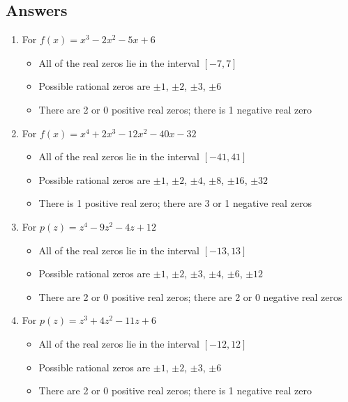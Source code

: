 \documentclass{ximera}
\begin{document}
	\author{Stitz-Zeager}



\subsection{Answers}

\begin{enumerate}

\item For $f(x) = x^{3} - 2x^{2} - 5x + 6$
\begin{itemize}
\item  All of the real zeros lie in the interval $[-7,7]$
\item  Possible rational zeros are $\pm 1$, $\pm 2$, $\pm 3$, $\pm 6$
\item  There are 2 or 0 positive real zeros;  there is 1 negative real zero
\end{itemize}

\item For  $f(x) = x^{4} + 2x^{3} - 12x^{2} - 40x - 32$
\begin{itemize}
\item  All of the real zeros lie in the interval $[-41,41]$
\item  Possible rational zeros are $\pm 1$, $\pm 2$, $\pm 4$, $\pm 8$, $\pm 16$, $\pm 32$
\item  There is 1 positive real zero;  there are 3 or 1 negative real zeros
\end{itemize}

\item For  $p(z) = z^{4} - 9z^{2} - 4z + 12$
\begin{itemize}
\item  All of the real zeros lie in the interval $[-13,13]$
\item  Possible rational zeros are $\pm 1$, $\pm 2$, $\pm 3$, $\pm 4$, $\pm 6$, $\pm 12$
\item  There are 2 or 0 positive real zeros;  there are 2 or 0 negative real zeros
\end{itemize}

\item For  $p(z) = z^{3} + 4z^{2} - 11z + 6$
\begin{itemize}
\item  All of the real zeros lie in the interval $[-12,12]$
\item  Possible rational zeros are $\pm 1$, $\pm 2$, $\pm 3$, $\pm 6$
\item  There are 2 or 0 positive real zeros;  there is 1 negative real zero
\end{itemize}


\end{enumerate}
\end{document}
